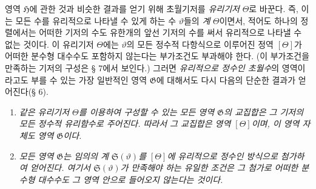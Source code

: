 
영역 $\mathfrak H$에 관한 것과 비슷한 결과를 얻기 위해 초월기저를 \emph{유리기저} $\Theta$로 바꾼다. 즉, 이는 모든 수를 유리적으로 나타낼 수 있게 하는 수 $\vartheta$들의 \emph{계} $\Theta$이면서, 적어도 하나의 정렬에서는 어떠한 기저의 수도 유한개의 앞선 기저의 수를 써서 유리적으로 나타낼 수 없는 것이다. 이 유리기저 $\Theta$에는 $\vartheta$의 모든 정수적 다항식으로 이루어진 정역 $[\Theta]$가 어떠한 분수형 대수수도 포함하지 않는다는 부가조건도 부과해야 한다. (이 부가조건을 만족하는 기저의 구성은 § 7에서 보인다.) 그러면 \emph{유리적으로 정수인 초월수}의 영역이라고도 부를 수 있는 가장 일반적인 영역 $\mathfrak G$에 대해서도 다시 다음의 단순한 결과가 얻어진다(§ 6).
\begin{enumerate}
\item[a)] \emph{같은 유리기저 $\Theta$를 이용하여 구성할 수 있는 모든 영역 $\mathfrak G$의 교집합은 그 기저의 모든 정수적 유리함수로 주어진다. 따라서 그 교집합은 영역 $[\Theta]$이며, 이 영역 자체도 영역 $\mathfrak G$이다.}
\item[b)] \emph{모든 영역 $\mathfrak G$는 임의의 계 $\mathfrak S(\vartheta)$를 $[\Theta]$에 유리적으로 정수인 방식으로 첨가하여 얻어진다. 여기서 $\mathfrak S(\vartheta)$가 만족해야 하는 유일한 조건은 그 첨가로 어떠한 분수형 대수수도 그 영역 안으로 들어오지 않는다는 것이다.}
\end{enumerate}
